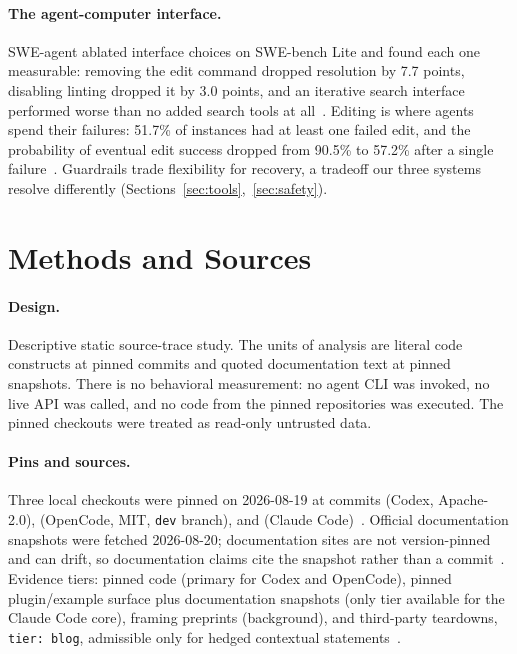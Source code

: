 \documentclass{article}
\newcommand{\codex}[0]{Codex}
\newcommand{\occ}[0]{OpenCode}
\newcommand{\ccc}[0]{Claude Code}
\begin{document}
\paragraph{The agent-computer interface.} SWE-agent ablated interface
choices on SWE-bench Lite and found each one measurable: removing the edit
command dropped resolution by 7.7 points, disabling linting dropped it by
3.0 points, and an iterative search interface performed worse than no added
search tools at all~\citep{yang2024sweagent}. Editing is where agents spend
their failures: 51.7\% of instances had at least one failed edit, and the
probability of eventual edit success dropped from 90.5\% to 57.2\% after a
single failure~\citep{yang2024sweagent}. Guardrails trade flexibility for
recovery, a tradeoff our three systems resolve differently
(Sections~\ref{sec:tools},~\ref{sec:safety}).

\section{Methods and Sources}
\label{sec:methods}

\paragraph{Design.} Descriptive static source-trace study. The units of
analysis are literal code constructs at pinned commits and quoted
documentation text at pinned snapshots. There is no behavioral measurement:
no agent CLI was invoked, no live API was called, and no code from the
pinned repositories was executed. The pinned checkouts were treated as
read-only untrusted data.

\paragraph{Pins and sources.} Three local checkouts were pinned on
2026-08-19 at commits  (\codex{},
Apache-2.0),  (\occ{}, MIT,
\texttt{dev} branch), and 
(\ccc{})~\citep{codexRepo,opencodeRepo,claudeCodeSurface}. Official
documentation snapshots were fetched 2026-08-20; documentation sites are
not version-pinned and can drift, so documentation claims cite the snapshot
rather than a commit~\citep{claudeCodeHooksDocs,claudeCodeSubagentsDocs,%
claudeCodePluginsDocs,claudeCodeMcpDocs,claudeCodeMemoryDocs,%
claudeCodePermissionsDocs,claudeCodeSandboxingDocs,codexSandboxingDocs,%
opencodeDocs,codexDocsRepo}. Evidence tiers: pinned code (primary for \codex{}
and \occ{}), pinned plugin/example surface plus documentation snapshots
(only tier available for the \ccc{} core), framing preprints
(background), and third-party teardowns, \texttt{tier: blog}, admissible
only for hedged contextual statements~\citep{minusXTeardown,agiflowInternals,%
tenguDecoded}.
\end{document}
